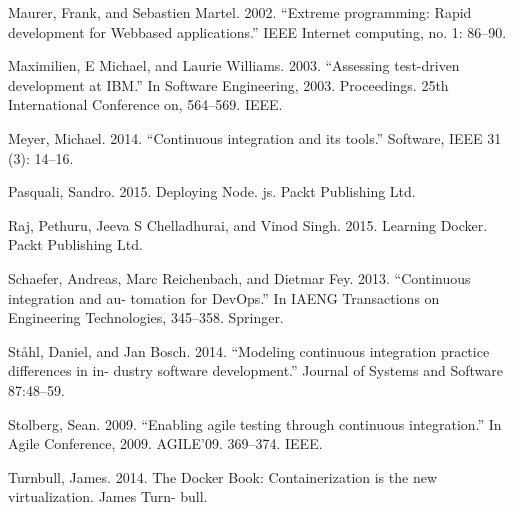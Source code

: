 Maurer, Frank, and Sebastien Martel. 2002. “Extreme programming: Rapid development for Webbased applications.” IEEE Internet computing, no. 1: 86–90.

Maximilien, E Michael, and Laurie Williams. 2003. “Assessing test-driven development at IBM.” In Software Engineering, 2003. Proceedings. 25th International Conference on, 564–569. IEEE.

Meyer, Michael. 2014. “Continuous integration and its tools.” Software, IEEE 31 (3): 14–16.

Pasquali, Sandro. 2015. Deploying Node. js. Packt Publishing Ltd.

Raj, Pethuru, Jeeva S Chelladhurai, and Vinod Singh. 2015. Learning Docker. Packt Publishing Ltd.

Schaefer, Andreas, Marc Reichenbach, and Dietmar Fey. 2013. “Continuous integration and au- tomation for DevOps.” In IAENG Transactions on Engineering Technologies, 345–358. Springer.

Ståhl, Daniel, and Jan Bosch. 2014. “Modeling continuous integration practice differences in in- dustry software development.” Journal of Systems and Software 87:48–59.

Stolberg, Sean. 2009. “Enabling agile testing through continuous integration.” In Agile Conference, 2009. AGILE’09. 369–374. IEEE.

Turnbull, James. 2014. The Docker Book: Containerization is the new virtualization. James Turn- bull.



\newpage
